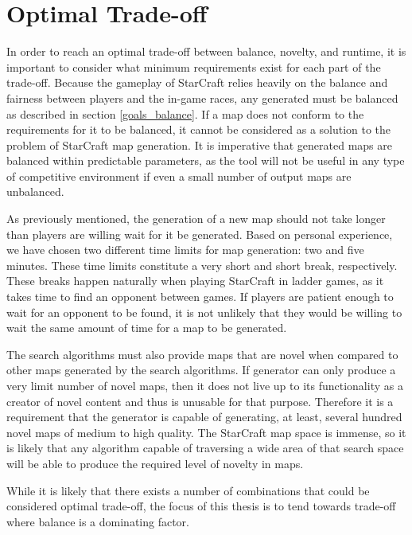 \section{Optimal Trade-off}
\label{goals_tradeoffs}
In order to reach an optimal trade-off between balance, novelty, and runtime, it is important to consider what minimum requirements exist for each part of the trade-off. Because the gameplay of StarCraft relies heavily on the balance and fairness between players and the in-game races, any generated must be balanced as described in section \ref{goals_balance}. If a map does not conform to the requirements for it to be balanced, it cannot be considered as a solution to the problem of StarCraft map generation. It is imperative that generated maps are balanced within predictable parameters, as the tool will not be useful in any type of competitive environment if even a small number of output maps are unbalanced.

As previously mentioned, the generation of a new map should not take longer than players are willing wait for it be generated. Based on personal experience, we have chosen two different time limits for map generation: two and five minutes. These time limits constitute a very short and short break, respectively. These breaks happen naturally when playing StarCraft in ladder games, as it takes time to find an opponent between games. If players are patient enough to wait for an opponent to be found, it is not unlikely that they would be willing to wait the same amount of time for a map to be generated.

The search algorithms must also provide maps that are novel when compared to other maps generated by the search algorithms. If generator can only produce a very limit number of novel maps, then it does not live up to its functionality as a creator of novel content and thus is unusable for that purpose. Therefore it is a requirement that the generator is capable of generating, at least, several hundred novel maps of medium to high quality. The StarCraft map space is immense, so it is likely that any algorithm capable of traversing a wide area of that search space will be able to produce the required level of novelty in maps.

While it is likely that there exists a number of combinations that could be considered optimal trade-off, the focus of this thesis is to tend towards trade-off where balance is a dominating factor.